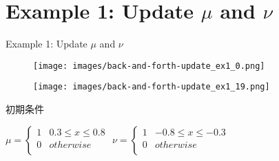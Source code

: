 \documentclass[aspectratio=169, dvipdfmx, 12pt]{beamer}
\begin{document}
\section{Example 1: Update $\mu$ and $\nu$}
\begin{frame}{Example 1: Update $\mu$ and $\nu$}
    \begin{figure}[htb]
        \begin{center}
            \begin{minipage}{0.45\hsize}
                \texttt{[image: images/back-and-forth-update\_ex1\_0.png]}
            \end{minipage}
            \begin{minipage}{0.45\hsize}
                \texttt{[image: images/back-and-forth-update\_ex1\_19.png]}
            \end{minipage}
        \end{center}
    \end{figure}
    \label{Example 1}

    初期条件
    \begin{center}
    $\mu = \left\{
        \begin{array}{ll}
            1 & 0.3 \le x \le 0.8 \\
            0 & otherwise \\
        \end{array}
    \right.
    $
    $\nu = \left\{
        \begin{array}{ll}
            1 & - 0.8 \le x \le - 0.3 \\
            0 & otherwise \\
        \end{array}
    \right.
    $
    \end{center}

\end{frame}

\end{document}
